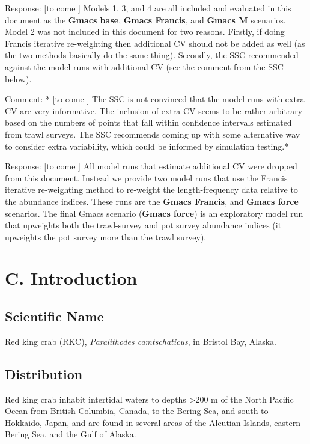 \documentclass[]{article}
\begin{document}
Response: {[}to come {]} Models 1, 3, and 4 are all included and
evaluated in this document as the \textbf{Gmacs base}, \textbf{Gmacs
Francis}, and \textbf{Gmacs M} scenarios. Model 2 was not included in
this document for two reasons. Firstly, if doing Francis iterative
re-weighting then additional CV should not be added as well (as the two
methods basically do the same thing). Secondly, the SSC recommended
against the model runs with additional CV (see the comment from the SSC
below).

Comment: * {[}to come {]} The SSC is not convinced that the model runs
with extra CV are very informative. The inclusion of extra CV seems to
be rather arbitrary based on the numbers of points that fall within
confidence intervals estimated from trawl surveys. The SSC recommends
coming up with some alternative way to consider extra variability, which
could be informed by simulation testing.*

Response: {[}to come {]} All model runs that estimate additional CV were
dropped from this document. Instead we provide two model runs that use
the Francis iterative re-weighting method to re-weight the
length-frequency data relative to the abundance indices. These runs are
the \textbf{Gmacs Francis}, and \textbf{Gmacs force} scenarios. The
final Gmacs scenario (\textbf{Gmacs force}) is an exploratory model run
that upweights both the trawl-survey and pot survey abundance indices
(it upweights the pot survey more than the trawl survey).

\section{C. Introduction}\label{c.-introduction}

\subsection{Scientific Name}\label{scientific-name}

Red king crab (RKC), \emph{Paralithodes camtschaticus}, in Bristol Bay,
Alaska.

\subsection{Distribution}\label{distribution}

Red king crab inhabit intertidal waters to depths \textgreater{}200 m of
the North Pacific Ocean from British Columbia, Canada, to the Bering
Sea, and south to Hokkaido, Japan, and are found in several areas of the
Aleutian Islands, eastern Bering Sea, and the Gulf of Alaska.
\end{document}
